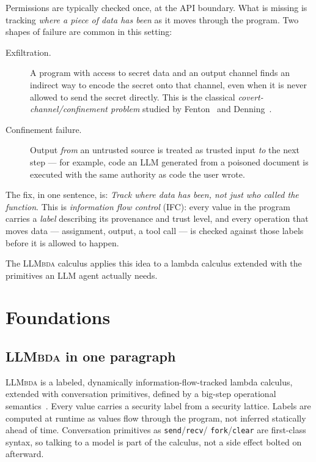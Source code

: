 \documentclass[11pt, a4paper]{article}
\newcommand{\LLMbda}{\textsc{LLMbda}\xspace}
\begin{document}
Permissions are typically checked once, at the API boundary. What is missing is
tracking \emph{where a piece of data has been} as it moves through the program.
Two shapes of failure are common in this setting:

\begin{description}
  \item[Exfiltration.] A program with access to secret data and an output
    channel finds an indirect way to encode the secret onto that channel,
    even when it is never allowed to send the secret directly. This is the
    classical \emph{covert-channel/confinement problem} studied by
    Fenton~\cite{fenton1974} and Denning~\cite{denning1976}.
  \item[Confinement failure.]
  \label{sec:confinement-intro}
  Output \emph{from} an untrusted source is
    treated as trusted input \emph{to} the next step --- for example, code
    an LLM generated from a poisoned document is executed with the same
    authority as code the user wrote.
\end{description}

The fix, in one sentence, is: \emph{Track where data has been, not just who
called the function}. This is \emph{information flow control} (IFC): every
value in the program carries a \emph{label} describing its provenance and trust
level, and every operation that moves data --- assignment, output, a tool call
--- is checked against those labels before it is allowed to happen. 

The \LLMbda calculus applies this idea to a lambda calculus extended with the
primitives an LLM agent actually needs.

\section{Foundations}

\subsection{\LLMbda in one paragraph}

\LLMbda is a labeled, dynamically information-flow-tracked lambda calculus,
extended with conversation primitives, defined by a big-step operational
semantics~\cite{llmbda}. Every value carries a security label from a security
lattice. Labels are computed at runtime as values flow through
the program, not inferred statically ahead of time.  Conversation primitives as
\lstinline{send}/\lstinline{recv}/ \lstinline{fork}/\lstinline{clear} are
first-class syntax, so talking to a model is part of the calculus, not a side
effect bolted on afterward.
\end{document}
